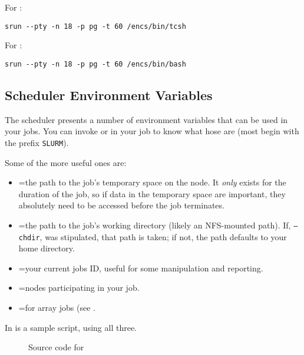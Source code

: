For :
\begin{verbatim}
srun --pty -n 18 -p pg -t 60 /encs/bin/tcsh
\end{verbatim}

For :
\begin{verbatim}
srun --pty -n 18 -p pg -t 60 /encs/bin/bash
\end{verbatim}

\subsection{Scheduler Environment Variables}
\label{sect:env-vars}

The scheduler presents a number of environment variables that can be used in 
your jobs. You can invoke  or  in your
job to know what hose are (most begin with the prefix \texttt{SLURM}).

Some of the more useful ones are:

\begin{itemize}
\item
=the path to the job's temporary space on the node. It
\emph{only} exists for the duration of the job, so if data in the temporary space 
are important, they absolutely need to be accessed before the job terminates.

\item
{}=the path to the job's working directory (likely an
NFS-mounted path). If, \texttt{--chdir}, was stipulated, that path is taken; if not, 
the path defaults to your home directory.


\item
{}=your current jobs ID, useful for some manipulation
and reporting.

\item
{}=nodes participating in your job.

\item
{}=for array jobs (see .

\end{itemize}

\noindent
In  is a sample script, using all three.

\begin{figure}[htpb]
    
    \caption{Source code for }
	\label{fig:tmpdir.sh}
\end{figure}
